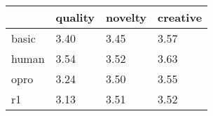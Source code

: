 \begin{tabular}{llll}
\toprule
 & quality & novelty & creative \\
\midrule
basic & 3.40 & 3.45 & 3.57 \\
human & 3.54 & 3.52 & 3.63 \\
opro & 3.24 & 3.50 & 3.55 \\
r1 & 3.13 & 3.51 & 3.52 \\
\bottomrule
\end{tabular}
